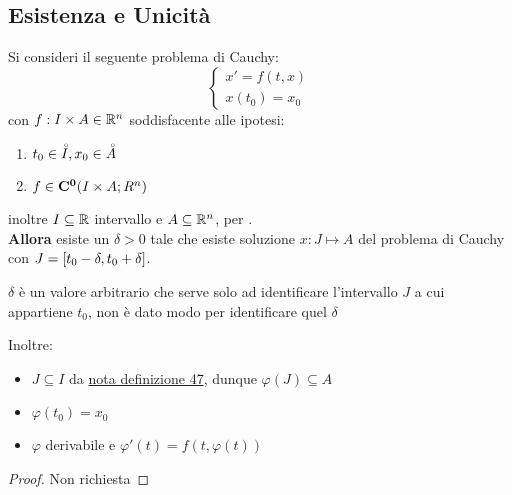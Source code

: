 \subsection{Esistenza e Unicità}
\begin{proposition}
	\label{teo:peano}
	Si consideri il seguente problema di Cauchy:
	$$\left\{\begin{matrix} x'=f(t,x)\\x(t_0)=x_0\end{matrix}\right.$$
	con $f:I\times A\in \mathbb{R}^n$ soddisfacente alle ipotesi:
	\begin{enumerate}
		\item $t_0\in \accentset{\circ}{I}, x_0\in \accentset{\circ}{A}$
		\item $f\in \mathbf{C^{0}}(I\times A;R^n)$
	\end{enumerate}
	inoltre $I\subseteq \mathbb{R}$ intervallo e $A\subseteq \mathbb{R}^n$, per .\\
	\textbf{Allora} esiste un $\delta>0$ tale che esiste soluzione $x:J\mapsto A$ del problema di Cauchy con $J=\left[t_0-\delta,t_0+\delta\right]$.
	\begin{note}
		$\delta$ è un valore arbitrario che serve solo ad identificare l'intervallo $J$ a cui appartiene $t_0$, non è dato modo per identificare quel $\delta$
	\end{note}
	\noindent Inoltre:
	\begin{itemize}
		\item $J\subseteq I$ da \hyperlink{note:diff_eq_sol_definit_set}{nota definizione 47}, dunque $\varphi(J)\subseteq A$
		\item $\varphi(t_0)=x_0$
		\item $\varphi$ derivabile e $\varphi'(t)=f(t,\varphi(t))$
	\end{itemize}
	\begin{proof}
		Non richiesta
	\end{proof}
\end{proposition}
